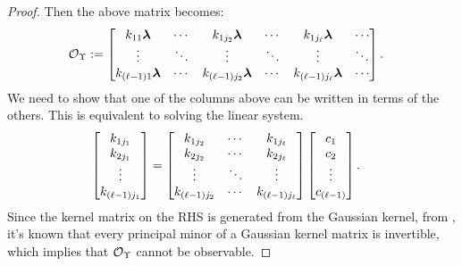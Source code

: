 \begin{proof}
	Then the above matrix becomes:
	\begin{align*}
	\mathcal{O}_{\Upsilon}
	&:= 
	\begin{bmatrix}
	k_{11}\boldsymbol{\lambda}  & \cdots & k_{1j_2}\boldsymbol{\lambda} & \cdots & k_{1j_{\ell}}\boldsymbol{\lambda} & \cdots\\
	\vdots & \ddots & \vdots & \ddots &\vdots & \ddots\\
	k_{(\ell-1)1}\boldsymbol{\lambda}  & \cdots & k_{(\ell-1)j_2}\boldsymbol{\lambda} & \cdots & k_{(\ell-1)j_{\ell}}\boldsymbol{\lambda} & \cdots
	\end{bmatrix}.
	\end{align*}
	We need to show that one of the columns above can be written in terms of the others. This is equivalent to solving the linear system.
	\begin{align*}
	\begin{bmatrix}
	k_{1j_1}\\
	k_{2j_1}\\
	\vdots\\
	k_{(\ell-1)j_1}
	\end{bmatrix}
	&=
	\begin{bmatrix}
	k_{1j_2} & \cdots & k_{1j_{\ell}}\\
	k_{2j_2} & \cdots & k_{2j_{\ell}}\\
	\vdots & \ddots & \vdots\\
	k_{(\ell-1)j_2} & \cdots & k_{(\ell-1)j_{\ell}}\\
	\end{bmatrix} 
	\begin{bmatrix}
	c_1\\
	c_2\\
	\vdots\\   
	c_{(\ell-1)}
	\end{bmatrix}. 
	\end{align*}
	Since the kernel matrix on the RHS is generated from the Gaussian kernel, from \cite{micchelli1984interpolation}, 
	it's known that every principal minor of a Gaussian kernel matrix is invertible, which implies that $\mathcal{O}_{\Upsilon}$ cannot be observable. 
\end{proof}


